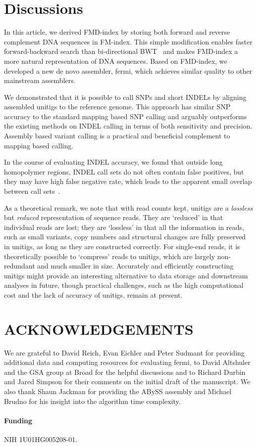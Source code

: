 \documentclass{bioinfo}
\begin{document}
\vspace*{-1em}

\section{Discussions}
In this article, we derived FMD-index by storing both forward and reverse
complement DNA sequences in FM-index. This simple modification enables faster
forward-backward search than bi-directional BWT~\citep{Lam:2009fk} and makes
FMD-index a more natural representation of DNA sequences. Based on FMD-index,
we developed a new de novo assembler, fermi, which achieves similar quality
to other mainstream assemblers.

We demonstrated that it is possible to call SNPs and short INDELs by aligning
assembled unitigs to the reference genome. This approach has similar SNP
accuracy to the standard mapping based SNP calling and arguably outperforms
the existing methods on INDEL calling in terms of both sensitivity and
precision. Assembly based variant calling is a practical and beneficial
complement to mapping based calling.

In the course of evaluating INDEL accuracy, we found that outside long
homopolymer regions, INDEL call sets do not often contain false positives, but
they may have high false negative rate, which leads to the apparent small
overlap between call sets~\citep{Lam:2012fk}.

As a theoretical remark, we note that with read counts kept, unitigs are a
\emph{lossless} but \emph{reduced} representation of sequence reads. They are
`reduced' in that individual reads are lost; they are `lossless' in that all
the information in reads, such as small variants, copy numbers and structural
changes are fully preserved in unitigs, as long as they are constructed
correctly. For single-end reads, it is theoretically possible to `compress'
reads to unitigs, which are largely non-redundant and much smaller in size.
Accurately and efficiently constructing unitigs might provide an interesting
alternative to data storage and downstream analyses in future, though practical
challenges, such as the high computational cost and the lack of accuracy of
unitigs, remain at present.

\vspace*{-1em}

\section*{ACKNOWLEDGEMENTS}
We are grateful to David Reich, Evan Eichler and Peter Sudmant for providing
additional data and computing resources for evaluating fermi, to David
Altshuler and the GSA group at Broad for the helpful discussions and to Richard
Durbin and Jared Simpson for their comments on the initial draft of the
manuscript. We also thank Shaun Jackman for providing the ABySS
assembly and Michael Brudno for his insight into the algorithm time complexity.

\paragraph{Funding\textcolon} NIH 1U01HG005208-01.

\end{document}
